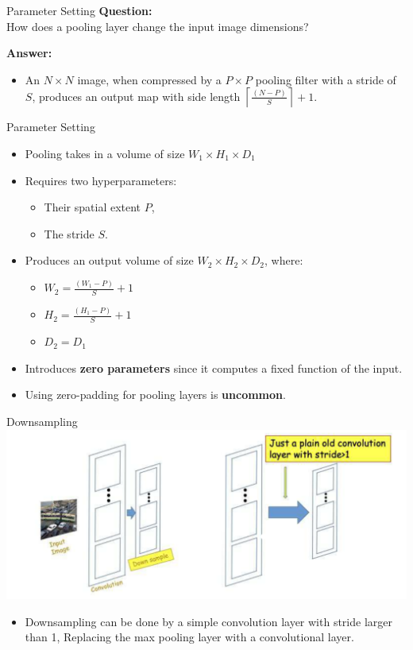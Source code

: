 \documentclass[default, aspectratio=169]{beamer}
\begin{document}
	\begin{frame}{Parameter Setting}
		\textbf{Question:} \\
		How does a pooling layer change the input image dimensions?
		
		\bigskip
		
		\textbf{Answer:} \\
		\begin{itemize}
			\item An $N \times N$ image, when compressed by a $P \times P$ pooling filter with a stride of $S$, produces an output map with side length $\left\lceil \frac{(N - P)}{S} \right\rceil + 1$.
			
		\end{itemize}
	\end{frame}
	\begin{frame}{Parameter Setting}
		\begin{itemize}
			\item Pooling takes in a volume of size $W_1 \times H_1 \times D_1$
			\item Requires two hyperparameters:
			\begin{itemize}
				\item Their spatial extent $P$,
				\item The stride $S$.
			\end{itemize}
			\item Produces an output volume of size $W_2 \times H_2 \times D_2$, where:
			\begin{itemize}
				\item $W_2 = \frac{(W_1 - P)}{S} + 1$
				\item $H_2 = \frac{(H_1 - P)}{S} + 1$
				\item $D_2 = D_1$
			\end{itemize}
			\item Introduces \textbf{zero parameters} since it computes a fixed function of the input.
			\item Using zero-padding for pooling layers is \textbf{uncommon}.
		\end{itemize}
	\end{frame}
	\begin{frame}{Downsampling}
		\centering
		\includegraphics[keepaspectratio, scale=0.55]{pic/pooling3.png}
		\smallskip
		\begin{itemize}
			\item Downsampling can be done by a simple convolution layer with stride larger than 1, Replacing the max pooling layer with a convolutional layer.
		\end{itemize}
		
	\end{frame}
\end{document}
